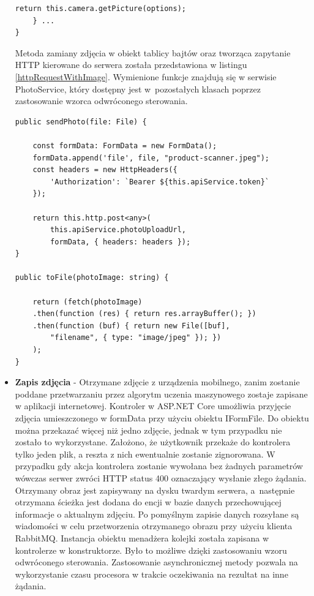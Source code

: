 \begin{itemize}
\begin{lstlisting}[caption=Wykorzystanie wtyczki w celu prezentacji zdjecia.]
		return this.camera.getPicture(options);
	} ...
}
\end{lstlisting} 

Metoda zamiany zdjęcia w obiekt tablicy bajtów oraz tworząca zapytanie HTTP kierowane do serwera została przedstawiona w listingu \ref{httpRequestWithImage}. Wymienione funkcje znajdują się w serwisie PhotoService, który dostępny jest w~pozostałych klasach poprzez zastosowanie wzorca odwróconego sterowania.

\begin{lstlisting}[caption={Zamiana base64 na tablicę bajtów oraz przesłanie zdjecia przy użyciu obiektu form data.},label={httpRequestWithImage}]
public sendPhoto(file: File) {

	const formData: FormData = new FormData();
	formData.append('file', file, "product-scanner.jpeg");
	const headers = new HttpHeaders({
		'Authorization': `Bearer ${this.apiService.token}`
	});
	
	return this.http.post<any>(
		this.apiService.photoUploadUrl, 
		formData, { headers: headers });
}

public toFile(photoImage: string) {

	return (fetch(photoImage)
	.then(function (res) { return res.arrayBuffer(); })
	.then(function (buf) { return new File([buf], 
		"filename", { type: "image/jpeg" }); })
	);
}
\end{lstlisting} 
\item \textbf{Zapis zdjęcia} - Otrzymane zdjęcie z urządzenia mobilnego, zanim zostanie poddane przetwarzaniu przez algorytm uczenia maszynowego zostaje zapisane w aplikacji internetowej. Kontroler w ASP.NET Core umożliwia przyjęcie zdjęcia umieszczonego w formData przy użyciu obiektu IFormFile. Do obiektu można przekazać więcej niż jedno zdjęcie, jednak w tym przypadku nie zostało to wykorzystane. Założono, że użytkownik przekaże do kontrolera tylko jeden plik, a reszta z nich ewentualnie zostanie zignorowana. W przypadku gdy akcja kontrolera zostanie wywołana bez żadnych parametrów wówczas serwer zwróci HTTP status 400 oznaczający wysłanie złego żądania. Otrzymany obraz jest zapisywany na dysku twardym serwera, a~następnie otrzymana ścieżka jest dodana do encji w bazie danych przechowującej informacje o aktualnym zdjęciu. Po pomyślnym zapisie danych rozsyłane są wiadomości w celu przetworzenia otrzymanego obrazu przy użyciu klienta RabbitMQ. Instancja obiektu menadżera kolejki została zapisana w kontrolerze w konstruktorze. Było to możliwe dzięki zastosowaniu wzoru odwróconego sterowania. Zastosowanie asynchronicznej metody pozwala na wykorzystanie czasu procesora w trakcie oczekiwania na rezultat na inne żądania. 


\end{itemize}
